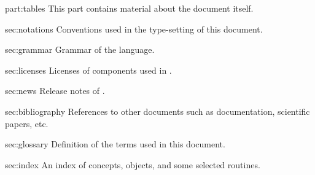 
\begin{partDescription}{part:tables}
  {
    This part contains material about the document itself.
  }

\item[sec:notations]
  Conventions used in the type-setting of this document.

\item[sec:grammar]
  Grammar of the \us language.

\item[sec:licenses]
  Licenses of components used in \usdk.

\item[sec:news]
  Release notes of \usdk.

\item[sec:bibliography] References to other documents such as documentation,
  scientific papers, etc.

\item[sec:glossary]
  Definition of the terms used in this document.

\item[sec:index]
  An index of concepts, objects, and some selected routines.
\end{partDescription}


